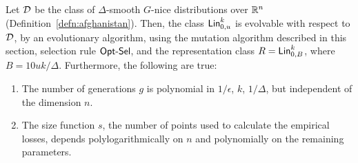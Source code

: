 \begin{theorem} \label{thm:greedy} Let ${\mathcal D}$ be the class of $\Delta$-smooth
$G$-nice distributions over $\mathbb{R}^n$ (Definition~\ref{defn:afghanistan}).
Then, the class $\mathsf{Lin}^k_{0, u}$ is evolvable with respect to ${\mathcal D}$, by an
evolutionary algorithm, using the mutation algorithm described in this section,
selection rule $\mathsf{Opt\mbox{-}Sel}$, and the representation class $R = \mathsf{Lin}^k_{0, B}$,
where $B = 10 uk/\Delta$.  Furthermore, the following are true:
\begin{enumerate}
%
\item The number of generations $g$ is polynomial in $1/\epsilon$, $k$,
$1/\Delta$, but independent of the dimension $n$.
%
\item The size function $s$, the number of points used to calculate the
empirical losses, depends polylogarithmically on $n$ and polynomially on the
remaining parameters.
\end{enumerate}
\end{theorem}
